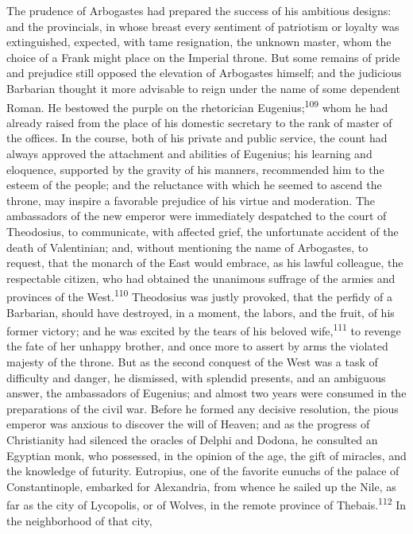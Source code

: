 The prudence of Arbogastes had prepared the success of his
ambitious designs: and the provincials, in whose breast every
sentiment of patriotism or loyalty was extinguished, expected,
with tame resignation, the unknown master, whom the choice of a
Frank might place on the Imperial throne. But some remains of
pride and prejudice still opposed the elevation of Arbogastes
himself; and the judicious Barbarian thought it more advisable to
reign under the name of some dependent Roman. He bestowed the
purple on the rhetorician Eugenius;\textsuperscript{109} whom he had already
raised from the place of his domestic secretary to the rank of
master of the offices. In the course, both of his private and
public service, the count had always approved the attachment and
abilities of Eugenius; his learning and eloquence, supported by
the gravity of his manners, recommended him to the esteem of the
people; and the reluctance with which he seemed to ascend the
throne, may inspire a favorable prejudice of his virtue and
moderation. The ambassadors of the new emperor were immediately
despatched to the court of Theodosius, to communicate, with
affected grief, the unfortunate accident of the death of
Valentinian; and, without mentioning the name of Arbogastes, to
request, that the monarch of the East would embrace, as his
lawful colleague, the respectable citizen, who had obtained the
unanimous suffrage of the armies and provinces of the West.\textsuperscript{110}
Theodosius was justly provoked, that the perfidy of a Barbarian,
should have destroyed, in a moment, the labors, and the fruit, of
his former victory; and he was excited by the tears of his
beloved wife,\textsuperscript{111} to revenge the fate of her unhappy brother, and
once more to assert by arms the violated majesty of the throne.
But as the second conquest of the West was a task of difficulty
and danger, he dismissed, with splendid presents, and an
ambiguous answer, the ambassadors of Eugenius; and almost two
years were consumed in the preparations of the civil war. Before
he formed any decisive resolution, the pious emperor was anxious
to discover the will of Heaven; and as the progress of
Christianity had silenced the oracles of Delphi and Dodona, he
consulted an Egyptian monk, who possessed, in the opinion of the
age, the gift of miracles, and the knowledge of futurity.
Eutropius, one of the favorite eunuchs of the palace of
Constantinople, embarked for Alexandria, from whence he sailed up
the Nile, as far as the city of Lycopolis, or of Wolves, in the
remote province of Thebais.\textsuperscript{112} In the neighborhood of that city,

